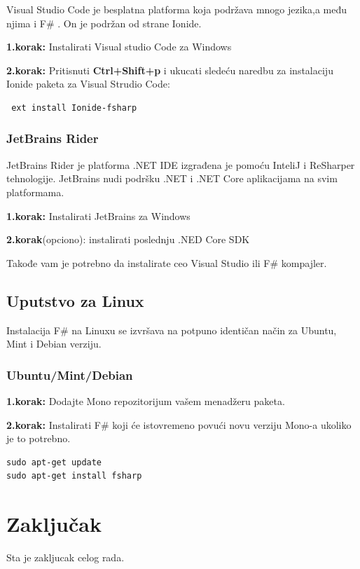 \documentclass[a4paper]{article}
\begin{document}
Visual Studio Code je besplatna platforma koja podržava mnogo jezika,a među njima i F\# . On je podržan od strane Ionide\cite{ionide}.

\textbf{1.korak:} Instalirati Visual studio Code za Windows

\textbf{2.korak:} Pritisnuti \textbf{Ctrl+Shift+p} i ukucati sledeću naredbu za instalaciju Ionide paketa za Visual Strudio Code:
\\
\begin{lstlisting}
 ext install Ionide-fsharp
\end{lstlisting}
 
\subsubsection{JetBrains Rider}

JetBrains Rider je platforma .NET IDE izgrađena je pomoću InteliJ i  ReSharper tehnologije. JetBrains nudi podršku .NET i .NET Core aplikacijama na svim platformama.

\textbf{1.korak:} Instalirati JetBrains za Windows

\textbf{2.korak}(opciono): instalirati poslednju .NED Core SDK

Takođe vam je potrebno da instalirate ceo Visual Studio ili F\# kompajler.


\subsection{Uputstvo za Linux}

Instalacija F\# na Linuxu se izvršava na potpuno identičan način za Ubuntu, Mint i Debian verziju.

\subsubsection{Ubuntu/Mint/Debian}

\textbf{1.korak:} Dodajte Mono\cite{mono} repozitorijum vašem menadžeru paketa.

\textbf{2.korak:} Instalirati F\# koji će istovremeno povući novu verziju Mono-a ukoliko je to potrebno.
\\
\begin{lstlisting}
sudo apt-get update
sudo apt-get install fsharp
\end{lstlisting}
 

\section{Zaključak}
\label{sec:zakljucak}

Sta je zakljucak celog rada.

\appendix
 

\end{document}
